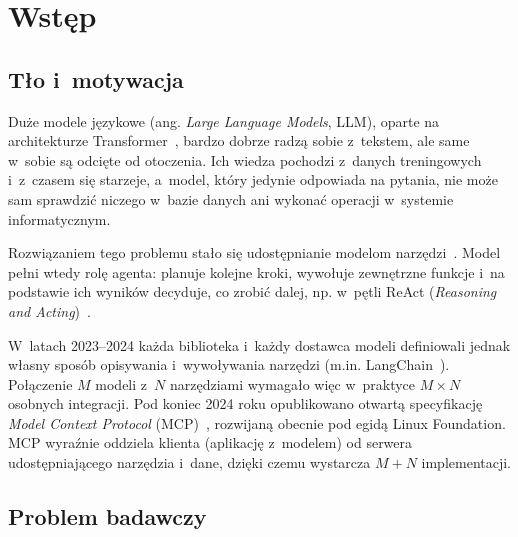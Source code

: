\chapter{Wstęp}
\label{chap:wstep}

\section{Tło i~motywacja}
\label{sec:wstep_kontekst}

Duże modele językowe (ang. \emph{Large Language Models}, LLM), oparte na architekturze Transformer~\cite{vaswani2017attention}, bardzo dobrze radzą sobie z~tekstem, ale same w~sobie są odcięte od otoczenia. Ich wiedza pochodzi z~danych treningowych i~z~czasem się starzeje, a~model, który jedynie odpowiada na pytania, nie może sam sprawdzić niczego w~bazie danych ani wykonać operacji w~systemie informatycznym.

Rozwiązaniem tego problemu stało się udostępnianie modelom narzędzi~\cite{schick2023toolformer,patil2023gorilla}. Model pełni wtedy rolę agenta: planuje kolejne kroki, wywołuje zewnętrzne funkcje i~na podstawie ich wyników decyduje, co zrobić dalej, np. w~pętli ReAct (\emph{Reasoning and Acting})~\cite{yao2023react}.

W~latach 2023--2024 każda biblioteka i~każdy dostawca modeli definiowali jednak własny sposób opisywania i~wywoływania narzędzi (m.in. LangChain~\cite{chase2022langchain}). Połączenie $M$ modeli z~$N$ narzędziami wymagało więc w~praktyce $M \times N$ osobnych integracji. Pod koniec 2024 roku opublikowano otwartą specyfikację \emph{Model Context Protocol} (MCP)~\cite{mcp_spec}, rozwijaną obecnie pod egidą Linux Foundation. MCP wyraźnie oddziela klienta (aplikację z~modelem) od serwera udostępniającego narzędzia i~dane, dzięki czemu wystarcza $M + N$ implementacji.


\section{Problem badawczy}
\label{sec:wstep_problem_badawczy}


